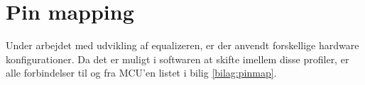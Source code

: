 \section{Pin mapping}
Under arbejdet med udvikling af equalizeren, er der anvendt forskellige hardware konfigurationer.
Da det er muligt i softwaren at skifte imellem disse profiler, er alle forbindelser til og fra MCU'en listet i bilig \ref{bilag:pinmap}.
